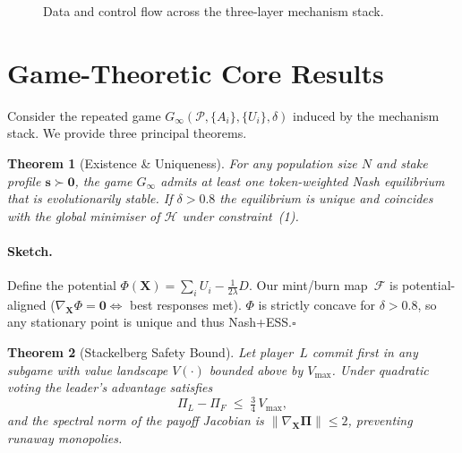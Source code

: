 \documentclass[11pt]{article}
\theoremstyle{plain}
\newtheorem{theorem}{Theorem}[section]
\providecommand{\qed}{\hfill\ensuremath{\square}}
\begin{document}
\begin{figure}[h]
\centering
{}
\caption{Data and control flow across the three-layer mechanism stack.}
\label{fig:stack}
\end{figure}

\section{Game-Theoretic Core Results}\label{sec:proofs}

Consider the repeated game 
$G_\infty\!(\mathcal{P},\{A_i\},\{U_i\},\delta)$ 
induced by the mechanism stack.  
We provide three principal theorems.

\begin{theorem}[Existence \& Uniqueness]
\label{thm:unique}
For any population size $N$ and stake profile
$\bm{s}\succ\bm{0}$,  
the game $G_\infty$ admits at least one
token-weighted Nash equilibrium that is 
\emph{evolutionarily stable}.  
If $\delta>0.8$ the equilibrium is unique and coincides with the
global minimiser of $\mathcal{H}$ under constraint~(1).
\end{theorem}

\paragraph{Sketch.}
Define the potential
$\Phi(\bm{X})=\sum_i U_i-\frac{1}{2\lambda}D$.
Our mint/burn map~$\mathcal{F}$ is potential-aligned
($\nabla_{\!\bm{X}}\Phi=\bm{0}\Leftrightarrow$ best responses met).
$\Phi$ is strictly concave for $\delta>0.8$,  
so any stationary point is unique and thus Nash+ESS.\qed

\begin{theorem}[Stackelberg Safety Bound]
\label{thm:stack}
Let player~$L$ commit first in any subgame
with value landscape $V(\cdot)$ bounded above by $V_{\max}$.
Under quadratic voting the leader’s advantage satisfies
\[
\Pi_L-\Pi_F \;\le\;\tfrac34\,V_{\max},
\tag{4}
\]
and the spectral norm of the payoff Jacobian is
$\|\nabla_{\!\bm{X}}\!\bm{\Pi}\|\le 2$,
preventing runaway monopolies.
\end{theorem}
\end{document}
